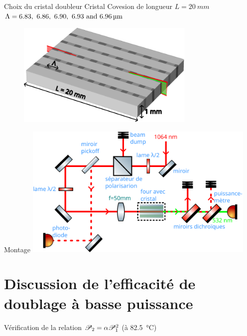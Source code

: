 \documentclass{beamer}
\newcommand{\lmbd}[1]{\SI{#1}{\nano\metre}}
\begin{document}
\begin{frame}{Choix du cristal doubleur}
Cristal Covesion de longueur $L=\SI{20}{mm}$ \\
$\Lambda = \qtylist[list-units = single]{6.83; 6.86 ; 6.90 ; 6.93 ; 6,96}{\micro\meter}$
\begin{figure}
\centering
\includegraphics[height=5cm]{img/cristal2.pdf} %
\end{figure}
\end{frame}

\begin{frame}{Montage}
\centering
\includegraphics[height=6.4cm]{img/schema.pdf}
\end{frame}

\section{Discussion de l'efficacité de doublage à basse puissance}

\begin{frame}{Vérification de la relation $\P_2 = \alpha \P_1^2$ (à \SI{82.5}{\celsius})} 
\centering

\end{frame}
\end{document}

